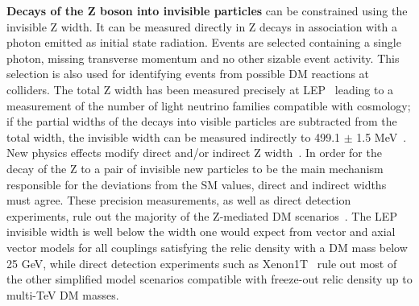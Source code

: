 \textbf{Decays of the Z boson into invisible particles} can be constrained using the invisible Z width. It can be measured directly in Z decays in association with a photon emitted as initial state radiation. Events are selected containing a single photon, missing transverse momentum and no other sizable event activity. This selection is also used for identifying events from possible DM reactions at colliders.
The total Z width has been measured precisely at LEP~\cite{ALEPH:2005ab} leading to a measurement of the number of light neutrino families compatible with cosmology; if the partial widths of the decays into visible particles are subtracted from the total width, the invisible width can be measured indirectly to 499.1 $\pm$ 1.5 MeV~\cite{Patrignani:2016xqp}. 
New physics effects modify direct and/or indirect Z width~\cite{Carena:2003aj}. In order for the decay of the Z to a pair of invisible new particles to be the main mechanism responsible for the deviations from the SM values, direct and indirect widths must agree. 
These precision measurements, as well as direct detection experiments, rule out the majority of the Z-mediated DM scenarios~\cite{Arcadi:2014lta,Escudero:2016gzx}. The LEP invisible width is well below the width one would expect from vector and axial vector models for all couplings satisfying the relic density with a DM mass below 25 GeV, while direct detection experiments such as Xenon1T~\cite{Aprile:2017iyp} 
rule out most of the other simplified model scenarios compatible with freeze-out relic density up to multi-TeV DM masses.


